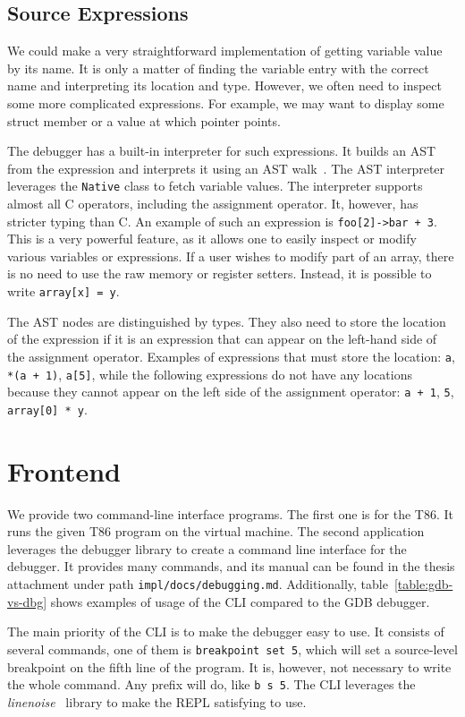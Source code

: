 \subsection{Source Expressions}
We could make a very straightforward implementation of getting variable value
by its name. It is only a matter of finding the variable entry with the correct
name and interpreting its location and type. However, we often need to inspect
some more complicated expressions. For example, we may want to display some
struct member or a value at which pointer points.

The debugger has a built-in interpreter for such expressions. It builds an AST
from the expression and interprets it using an
AST walk~\cite{crafting-interpreters}. The AST interpreter leverages the
\texttt{Native} class to fetch variable values. The interpreter supports almost
all C operators, including the assignment operator. It, however, has stricter
typing than C. An example of such an expression is \texttt{foo[2]->bar + 3}.
This is a very powerful feature, as it allows one to easily inspect or modify
various variables or expressions. If a user wishes to modify part of an array,
there is no need to use the raw memory or register setters. Instead, it is
possible to write \texttt{array[x] = y}.

The AST nodes are distinguished by types. They also need to store the location
of the expression  if it is an expression that can appear on the left-hand
side of the assignment operator. Examples of expressions that must store the
location: \texttt{a}, \texttt{*(a + 1)}, \texttt{a[5]}, while the following
expressions do not have any locations because they cannot appear on the left
side of the assignment operator: \texttt{a + 1}, \texttt{5}, \texttt{array[0]
* y}.

\section{Frontend}
We provide two command-line interface programs. The first one is for the T86.
It runs the given T86 program on the virtual machine. The second application
leverages the debugger library to create a command line interface for the
debugger. It provides many commands, and its manual can be found in the thesis
attachment under path \texttt{impl/docs/debugging.md}. Additionally,
table~\ref{table:gdb-vs-dbg} shows examples of usage of the CLI compared to the
GDB debugger.

The main priority of the CLI is to make the debugger easy to use. It consists
of several commands, one of them is \texttt{breakpoint set 5}, which will set a
source-level breakpoint on the fifth line of the program. It is, however, not
necessary to write the whole command. Any prefix will do, like \texttt{b s 5}.
The CLI leverages the \textit{linenoise}~\cite{linenoise} library to make the
REPL satisfying to use.

